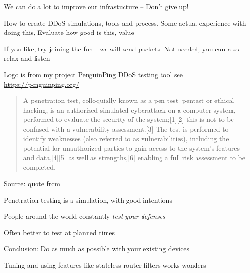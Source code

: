 \documentclass[Screen16to9,17pt]{foils}
\begin{document}
We can do a lot to improve our infrastucture -- Don't give up!



\begin{list1}
\item How to create DDoS simulations, tools and process,
Some actual experience with doing this, Evaluate how good is this, value
\item If you like, try joining the fun - we will send packets! Not needed, you can also relax and listen
\item Logo is from my project PenguinPing DDoS testing tool see \url{https://penguinping.org/}
\end{list1}






\begin{quote}
  A penetration test, colloquially known as a pen test, pentest or ethical hacking, is an authorized simulated cyberattack on a computer system, performed to evaluate the security of the system;[1][2] this is not to be confused with a vulnerability assessment.[3] The test is performed to identify weaknesses (also referred to as vulnerabilities), including the potential for unauthorized parties to gain access to the system's features and data,[4][5] as well as strengths,[6] enabling a full risk assessment to be completed.
\end{quote}
Source: quote from 

\begin{list1}
\item Penetration testing is a simulation, with good intentions
\item People around the world constantly \emph{test your defenses}
\item Often better to test at planned times
\end{list1}




\begin{list1}
\item Conclusion: Do as much as possible with your existing devices
\item Tuning and using features like stateless router filters works wonders
\end{list1}
\end{document}
